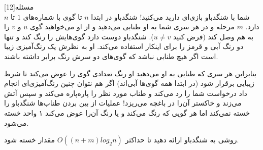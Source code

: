 ‌مسئله[12]
\\
شما با شنگدباو بازی‌ای دارید می‌کنید! شنگدباو در ابتدا $n$ تا گوی با شماره‌های $1$ تا $n$ دارد. $m$ مرحله و در هر سری شما به او طنابی می‌دهید و از او می‌خواهید گوی $u$ و $v$ را به هم وصل کند (فرض کنید $u \neq v$). شنگدباو دوست دارد گوی‌هایش را رنگ کند و تنها دو رنگ آبی و قرمز را برای اینکار استفاده می‌کند. او به نظرش یک رنگ‌آمیزی زیبا است اگر هیچ طنابی نباشد که گوی‌های دو سرش رنگ برابر داشته باشند.

بنابراین هر سری که طنابی به او می‌دهید او رنگ تعدادی گوی را عوض می‌کند تا شرط زیبایی برقرار شود (در ابتدا همه گوی‌ها آبی‌اند) اگر هم نتوان چنین رنگ‌آمیزی‌ای انجام داد درخواست شما را رد می‌کند و طناب مورد نظر را پاره‌پاره می‌کند و سپس آتش می‌زند و خاکستر آن‌را در باغچه می‌ریزد! 
عملیات از بین بردن طناب‌ها شنگدباو را خسته نمی‌کند اما هر گویی که رنگ می‌کند و یا رنگ آن‌را عوض می‌کند ۱ واحد خسته می‌شود. 

روشی به شنگدباو ارائه دهید تا حداکثر
$O((n + m) log_2n)$
مقدار خسته شود.







